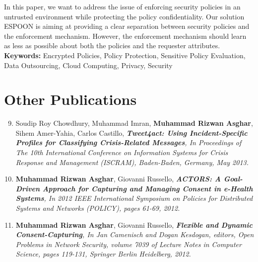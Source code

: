 \documentclass[epsfig,a4paper,11pt,titlepage]{book}
\numberwithin{algorithm}{chapter}
\begin{document}
\begin{enumerate}
	In this paper, we want to address the issue of enforcing security policies in an untrusted environment while protecting the policy confidentiality. Our solution \gls{ESPOON} is aiming at providing a clear separation between security policies and the enforcement mechanism. However, the enforcement mechanism should learn as less as possible about both the policies and the requester attributes. \vspace{3mm} \\
\textbf{Keywords:} Encrypted Policies, Policy Protection, Sensitive Policy Evaluation, Data Outsourcing, Cloud Computing, Privacy, Security
	
\end{enumerate}


\section{Other Publications}

  
\begin{enumerate}\setcounter{enumi}{8}
  
  \item
Soudip Roy Chowdhury, Muhammad Imran, \textbf{Muhammad Rizwan Asghar}, Sihem Amer-Yahia, Carlos Castillo, \textit{\textbf{Tweet4act: Using Incident-Specific Profiles for Classifying Crisis-Related Messages}, In Proceedings of The 10th International Conference on Information Systems for Crisis Response and Management (ISCRAM), Baden-Baden, Germany, May 2013.}


  \item
\textbf{Muhammad Rizwan Asghar}, Giovanni Russello, \textit{\textbf{ACTORS: A Goal-Driven Approach for Capturing and Managing Consent in e-Health Systems}, In 2012 IEEE International Symposium on Policies for Distributed Systems and Networks (POLICY), pages 61-69, 2012.}


	\item
\textbf{Muhammad Rizwan Asghar}, Giovanni Russello, \textit{\textbf{Flexible and Dynamic \\ Consent-Capturing}, In Jan Camenisch and Dogan Kesdogan, editors, Open Problems in Network Security, volume 7039 of Lecture Notes in Computer Science, pages 119-131, Springer Berlin Heidelberg, 2012.}


\end{enumerate}
\end{document}

